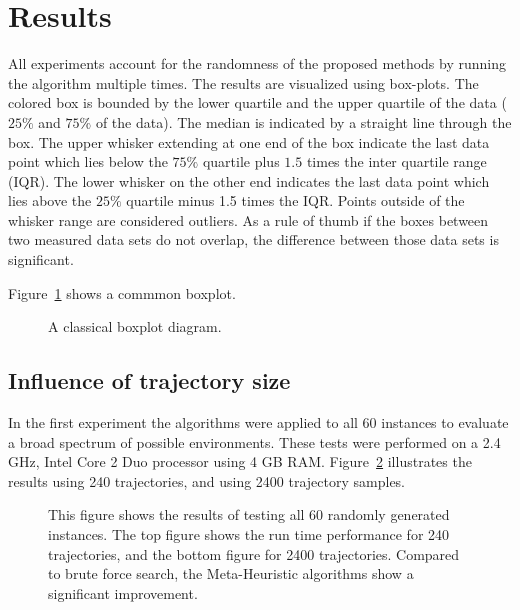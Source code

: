 \section{Results}\label{sec:testresults}
All experiments account for the randomness of the proposed methods by running the algorithm multiple times.
The results are visualized using box-plots. 
The colored box is bounded by the lower quartile and the upper quartile of the data ($25\%$ and $75\%$ of the data). 
The median is indicated by a straight line through the box. 
The upper whisker extending at one end of the box indicate the last data point which lies below the $75\%$ quartile plus $1.5$ times the
inter quartile range (IQR). The lower whisker on the other end indicates the last data point which lies above the $25\%$ quartile minus 1.5 times the IQR. 
Points outside of the whisker range are considered outliers.
As a rule of thumb if the boxes between two measured data sets do not overlap, the difference between those data sets is significant.

Figure~\ref{fig:fig_boxplot} shows a commmon boxplot. 
\begin{figure}[thpb]
     \footnotesize
      \centering
      \myfloatalign
      \setlength\fboxsep{0pt}
      \setlength\fboxrule{0.5pt}
       \caption{A classical boxplot diagram.}
      \label{fig:fig_boxplot}
   \end{figure}

\subsection{Influence of trajectory size}
In the first experiment the algorithms were applied to all 60 instances to evaluate a broad spectrum of possible environments. These tests were performed on a 2.4 GHz, Intel Core 2 Duo processor using 4 GB RAM.  
Figure~\ref{fig:fig_allworlds} illustrates the results using 240 trajectories, and using 2400 trajectory samples.
   \begin{figure}[thpb]
        \footnotesize
      \centering
      \def\svgwidth{\textwidth}
      
      \caption{This figure shows the results of testing all 60 randomly generated instances. The top figure shows the run time performance for 240 trajectories, and the bottom figure for 2400 trajectories. Compared to brute force search, the Meta-Heuristic algorithms show a significant improvement. }
      \label{fig:fig_allworlds}
   \end{figure}

